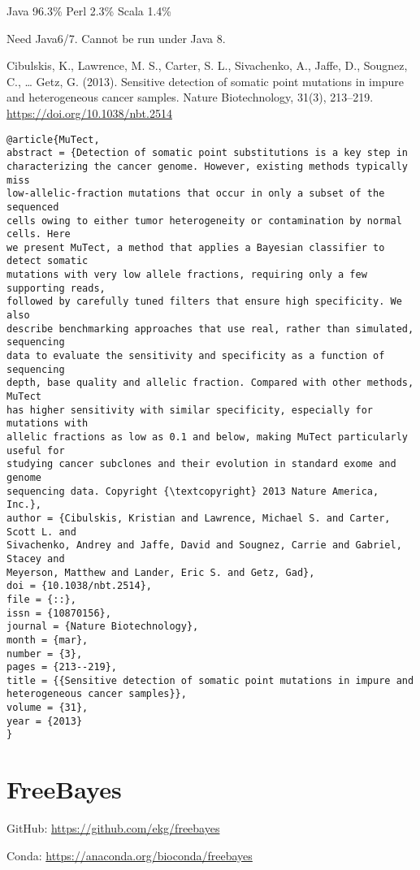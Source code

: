 \documentclass[]{article}
\begin{document}
Java 96.3\% Perl 2.3\% Scala 1.4\%

Need Java6/7. Cannot be run under Java 8.

Cibulskis, K., Lawrence, M. S., Carter, S. L., Sivachenko, A., Jaffe, D., Sougnez, C., … Getz, G. (2013). Sensitive detection of somatic point mutations in impure and heterogeneous cancer samples. Nature Biotechnology, 31(3), 213–219. \url{https://doi.org/10.1038/nbt.2514}

\begin{verbatim}
@article{MuTect,
abstract = {Detection of somatic point substitutions is a key step in
characterizing the cancer genome. However, existing methods typically miss
low-allelic-fraction mutations that occur in only a subset of the sequenced
cells owing to either tumor heterogeneity or contamination by normal cells. Here
we present MuTect, a method that applies a Bayesian classifier to detect somatic
mutations with very low allele fractions, requiring only a few supporting reads,
followed by carefully tuned filters that ensure high specificity. We also
describe benchmarking approaches that use real, rather than simulated, sequencing
data to evaluate the sensitivity and specificity as a function of sequencing
depth, base quality and allelic fraction. Compared with other methods, MuTect
has higher sensitivity with similar specificity, especially for mutations with
allelic fractions as low as 0.1 and below, making MuTect particularly useful for
studying cancer subclones and their evolution in standard exome and genome
sequencing data. Copyright {\textcopyright} 2013 Nature America, Inc.},
author = {Cibulskis, Kristian and Lawrence, Michael S. and Carter, Scott L. and
Sivachenko, Andrey and Jaffe, David and Sougnez, Carrie and Gabriel, Stacey and
Meyerson, Matthew and Lander, Eric S. and Getz, Gad},
doi = {10.1038/nbt.2514},
file = {::},
issn = {10870156},
journal = {Nature Biotechnology},
month = {mar},
number = {3},
pages = {213--219},
title = {{Sensitive detection of somatic point mutations in impure and
heterogeneous cancer samples}},
volume = {31},
year = {2013}
}
\end{verbatim}

\section{FreeBayes}

GitHub: \url{https://github.com/ekg/freebayes}

Conda: \url{https://anaconda.org/bioconda/freebayes}
\end{document}
